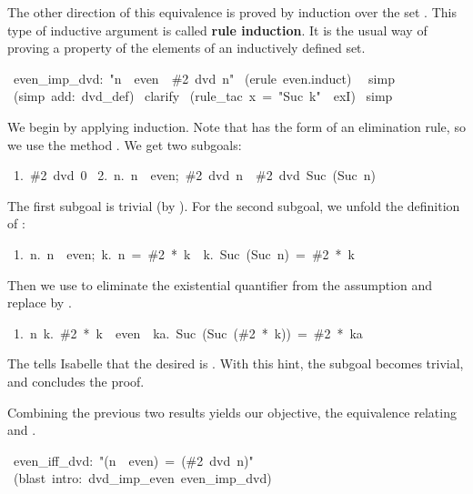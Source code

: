 The other direction of this equivalence is proved by induction over the set
.   This type of inductive argument is called \textbf{rule induction}. 
It is the usual way of proving a property of the elements of an inductively
defined set.
\begin{isabelle}
\ even_imp_dvd:\ "n\ \isasymin \ even\ \isasymLongrightarrow \ \#2\ dvd\ n"\isanewline
{}\ (erule\ even.induct)\isanewline
\ \ simp\isanewline
{}\ (simp\ add:\ dvd_def)\isanewline
{}\ clarify\isanewline
{}\ (rule_tac\ x\ =\ "Suc\ k"\ \ exI)\isanewline
{}\ simp\isanewline
{}
\end{isabelle}
%
We begin by applying induction.  Note that  has the form
of an elimination rule, so we use the method .  We get two
subgoals:
\begin{isabelle}
\ 1.\ \#2\ dvd\ 0\isanewline
\ 2.\ \isasymAnd n.\ \isasymlbrakk n\ \isasymin \ even;\ \#2\ dvd\ n\isasymrbrakk \ \isasymLongrightarrow \ \#2\ dvd\ Suc\ (Suc\ n)
\end{isabelle}
%
The first subgoal is trivial (by ).  For the second
subgoal, we unfold the definition of :
\begin{isabelle}
\ 1.\ \isasymAnd n.\ \isasymlbrakk n\ \isasymin \ even;\ \isasymexists k.\
n\ =\ \#2\ *\ k\isasymrbrakk \ \isasymLongrightarrow \ \isasymexists k.\
Suc\ (Suc\ n)\ =\ \#2\ *\ k
\end{isabelle}
%
Then we use
 to eliminate the existential quantifier from the assumption
and replace  by .
\begin{isabelle}
\ 1.\ \isasymAnd n\ k.\ \#2\ *\ k\ \isasymin \ even\ \isasymLongrightarrow \ \isasymexists ka.\ Suc\ (Suc\ (\#2\ *\ k))\ =\ \#2\ *\ ka%
\end{isabelle}
%
The  tells Isabelle that the desired
 is
\isa{Suc\ k}.  With this hint, the subgoal becomes trivial, and 
concludes the proof.

\medskip
Combining the previous two results yields our objective, the
equivalence relating  and . 
%
\begin{isabelle}
\ even_iff_dvd:\ "(n\ \isasymin \ even)\ =\ (\#2\ dvd\ n)"\isanewline
{}\ (blast\ intro:\ dvd_imp_even\ even_imp_dvd)\isanewline
\isacommand{done}
\end{isabelle}

